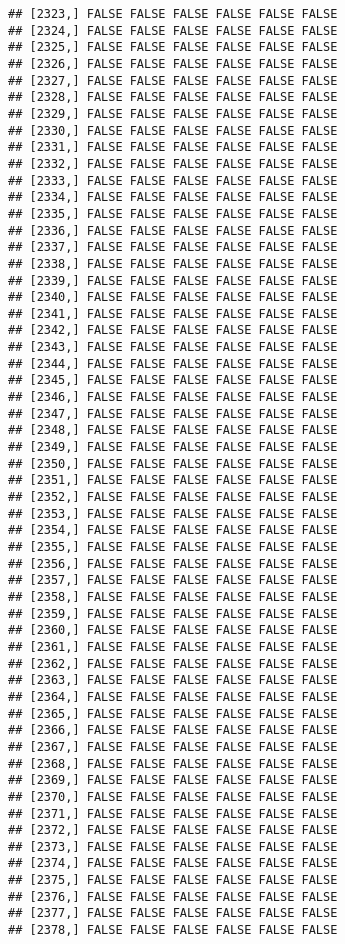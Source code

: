 \documentclass[
]{article}
\begin{document}
\begin{verbatim}
## [2323,] FALSE FALSE FALSE FALSE FALSE FALSE
## [2324,] FALSE FALSE FALSE FALSE FALSE FALSE
## [2325,] FALSE FALSE FALSE FALSE FALSE FALSE
## [2326,] FALSE FALSE FALSE FALSE FALSE FALSE
## [2327,] FALSE FALSE FALSE FALSE FALSE FALSE
## [2328,] FALSE FALSE FALSE FALSE FALSE FALSE
## [2329,] FALSE FALSE FALSE FALSE FALSE FALSE
## [2330,] FALSE FALSE FALSE FALSE FALSE FALSE
## [2331,] FALSE FALSE FALSE FALSE FALSE FALSE
## [2332,] FALSE FALSE FALSE FALSE FALSE FALSE
## [2333,] FALSE FALSE FALSE FALSE FALSE FALSE
## [2334,] FALSE FALSE FALSE FALSE FALSE FALSE
## [2335,] FALSE FALSE FALSE FALSE FALSE FALSE
## [2336,] FALSE FALSE FALSE FALSE FALSE FALSE
## [2337,] FALSE FALSE FALSE FALSE FALSE FALSE
## [2338,] FALSE FALSE FALSE FALSE FALSE FALSE
## [2339,] FALSE FALSE FALSE FALSE FALSE FALSE
## [2340,] FALSE FALSE FALSE FALSE FALSE FALSE
## [2341,] FALSE FALSE FALSE FALSE FALSE FALSE
## [2342,] FALSE FALSE FALSE FALSE FALSE FALSE
## [2343,] FALSE FALSE FALSE FALSE FALSE FALSE
## [2344,] FALSE FALSE FALSE FALSE FALSE FALSE
## [2345,] FALSE FALSE FALSE FALSE FALSE FALSE
## [2346,] FALSE FALSE FALSE FALSE FALSE FALSE
## [2347,] FALSE FALSE FALSE FALSE FALSE FALSE
## [2348,] FALSE FALSE FALSE FALSE FALSE FALSE
## [2349,] FALSE FALSE FALSE FALSE FALSE FALSE
## [2350,] FALSE FALSE FALSE FALSE FALSE FALSE
## [2351,] FALSE FALSE FALSE FALSE FALSE FALSE
## [2352,] FALSE FALSE FALSE FALSE FALSE FALSE
## [2353,] FALSE FALSE FALSE FALSE FALSE FALSE
## [2354,] FALSE FALSE FALSE FALSE FALSE FALSE
## [2355,] FALSE FALSE FALSE FALSE FALSE FALSE
## [2356,] FALSE FALSE FALSE FALSE FALSE FALSE
## [2357,] FALSE FALSE FALSE FALSE FALSE FALSE
## [2358,] FALSE FALSE FALSE FALSE FALSE FALSE
## [2359,] FALSE FALSE FALSE FALSE FALSE FALSE
## [2360,] FALSE FALSE FALSE FALSE FALSE FALSE
## [2361,] FALSE FALSE FALSE FALSE FALSE FALSE
## [2362,] FALSE FALSE FALSE FALSE FALSE FALSE
## [2363,] FALSE FALSE FALSE FALSE FALSE FALSE
## [2364,] FALSE FALSE FALSE FALSE FALSE FALSE
## [2365,] FALSE FALSE FALSE FALSE FALSE FALSE
## [2366,] FALSE FALSE FALSE FALSE FALSE FALSE
## [2367,] FALSE FALSE FALSE FALSE FALSE FALSE
## [2368,] FALSE FALSE FALSE FALSE FALSE FALSE
## [2369,] FALSE FALSE FALSE FALSE FALSE FALSE
## [2370,] FALSE FALSE FALSE FALSE FALSE FALSE
## [2371,] FALSE FALSE FALSE FALSE FALSE FALSE
## [2372,] FALSE FALSE FALSE FALSE FALSE FALSE
## [2373,] FALSE FALSE FALSE FALSE FALSE FALSE
## [2374,] FALSE FALSE FALSE FALSE FALSE FALSE
## [2375,] FALSE FALSE FALSE FALSE FALSE FALSE
## [2376,] FALSE FALSE FALSE FALSE FALSE FALSE
## [2377,] FALSE FALSE FALSE FALSE FALSE FALSE
## [2378,] FALSE FALSE FALSE FALSE FALSE FALSE

\end{verbatim}
\end{document}
